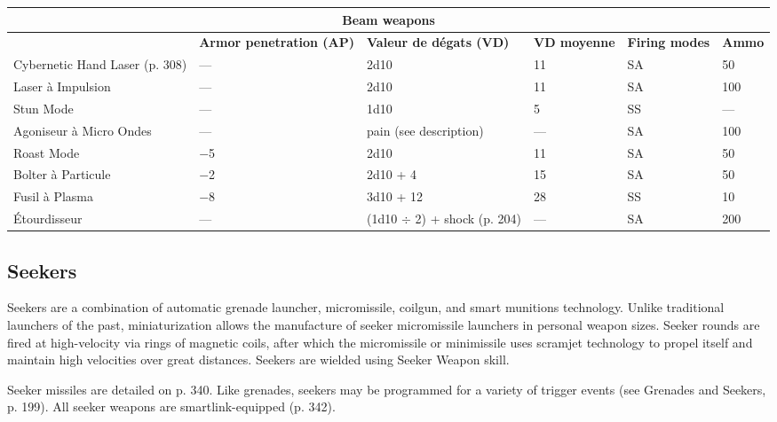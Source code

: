 {{\begin{table}
\begin{tabularx}{\textwidth}{|X|X|X|X|l|l|}
\multicolumn{6}{|c|}{\textbf{Beam weapons}} \\ \hline

&\textbf{Armor penetration (AP)}	&\textbf{Valeur de dégats (VD)}	&\textbf{VD moyenne}	&\textbf{Firing modes}	&\textbf{Ammo} \\ \hline

Cybernetic Hand Laser (p. 308)	&--- &2d10	&11	&SA	&50 \\ \hline

Laser à Impulsion	&--- &2d10	&11	&SA	&100 \\ \hline

Stun Mode	&--- &1d10	&5	&SS	&--- \\ \hline

Agoniseur à Micro Ondes	&--- &pain (see description)	&--- &SA	&100 \\ \hline

Roast Mode	&$-$5	&2d10	&11	&SA	&50 \\ \hline

Bolter à Particule	&$-$2	&2d10 + 4	&15	&SA	&50 \\ \hline

Fusil à Plasma	&$-$8	&3d10 + 12	&28	&SS	&10 \\ \hline

Étourdisseur	&--- &(1d10 $\div$ 2) + shock (p. 204)	&--- &SA	&200 \\ \hline

\end{tabularx} \label{tab:beam-weapons} \end{table} 



\subsection{Seekers} \label{sec:seekers} 

Seekers are a combination of automatic grenade launcher, micromissile, coilgun, and smart munitions technology. Unlike traditional launchers of the past, miniaturization allows the manufacture of seeker micromissile launchers in personal weapon sizes. Seeker rounds are fired at high-velocity via rings of magnetic coils, after which the micromissile or minimissile uses scramjet technology to propel itself and maintain high velocities over great distances. Seekers are wielded using Seeker Weapon skill. 

Seeker missiles are detailed on p. 340. Like grenades, seekers may be programmed for a variety of trigger events (see Grenades and Seekers, p. 199). All seeker weapons are smartlink-equipped (p. 342). 

}}
